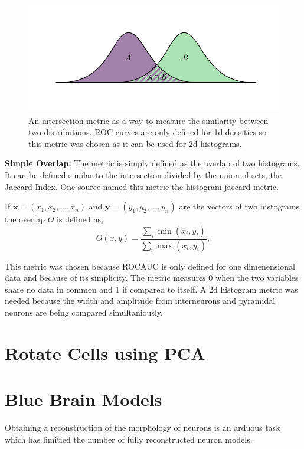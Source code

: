\documentclass[altfont, fleqn]{uiophd}
\begin{document}
\begin{figure}[h]
    \begin{center}
        \includegraphics[width=1\textwidth]{images/sec_3/hist_inter.pdf}
        \caption{
            An intersection metric as a way to measure the similarity
            between two distributions.
            ROC curves are only defined for 1d densities so this
            metric was chosen as it can be used for 2d histograms. 
        }
        \label{fig:3_hist_inter}
    \end{center}
\end{figure}

\noindent
{\bf Simple Overlap:}
The metric is simply defined as the overlap
of two histograms. 
It can be defined similar to the intersection divided by the union of sets, 
the Jaccard Index. 
One source named this metric the histogram jaccard metric. 

If 
$\bm{x} = (x_1, x_2, \ldots, x_n)$ and
$\bm{y} = (y_1, y_2, \ldots, y_n)$
are the vectors of two histograms 
the overlap $O$ is defined as, 
$$O(x, y) = \frac{\sum_i \min(x_i, y_i)}{\sum_i \max(x_i, y_i)},$$

This metric was chosen because ROCAUC is only defined for one
dimenensional data and because of its simplicity.
The metric measures 0 when the two variables share no data in common 
and 1 if compared to itself. 
A 2d histogram metric was needed because the width and amplitude from
interneurons and pyramidal neurons are being compared simultaniously. 
\newline 

\section{Rotate Cells using PCA}
\label{sec:pca_analysis}
\section{Blue Brain Models}
\label{sec:blue_brain}
Obtaining a reconstruction of the morphology of neurons is an
arduous task which has limitied the number of fully
reconstructed neuron models.
\end{document}
